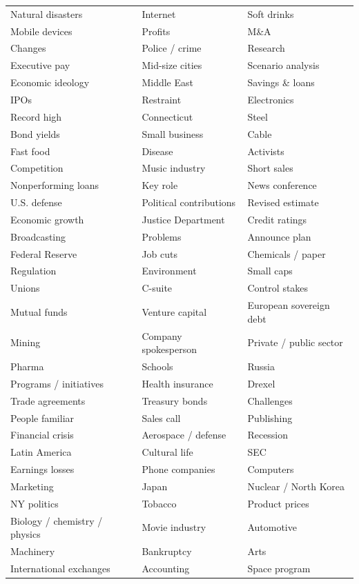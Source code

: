 \begin{longtable}{>{\raggedright\arraybackslash}p{}
                  >{\raggedright\arraybackslash}p{}
                  >{\raggedright\arraybackslash}p{}}
Natural disasters & Internet & Soft drinks \\
Mobile devices & Profits & M\&A \\
Changes & Police / crime & Research \\
Executive pay & Mid-size cities & Scenario analysis \\
Economic ideology & Middle East & Savings \& loans \\
IPOs & Restraint & Electronics \\
Record high & Connecticut & Steel \\
Bond yields & Small business & Cable \\
Fast food & Disease & Activists \\
Competition & Music industry & Short sales \\
Nonperforming loans & Key role & News conference \\
U.S. defense & Political contributions & Revised estimate \\
Economic growth & Justice Department & Credit ratings \\
Broadcasting & Problems & Announce plan \\
Federal Reserve & Job cuts & Chemicals / paper \\
Regulation & Environment & Small caps \\
Unions & C-suite & Control stakes \\
Mutual funds & Venture capital & European sovereign debt \\
Mining & Company spokesperson & Private / public sector \\
Pharma & Schools & Russia \\
Programs / initiatives & Health insurance & Drexel \\
Trade agreements & Treasury bonds & Challenges \\
People familiar & Sales call & Publishing \\
Financial crisis & Aerospace / defense & Recession \\
Latin America & Cultural life & SEC \\
Earnings losses & Phone companies & Computers \\
Marketing & Japan & Nuclear / North Korea \\
NY politics & Tobacco & Product prices \\
Biology / chemistry / physics & Movie industry & Automotive \\
Machinery & Bankruptcy & Arts \\
International exchanges & Accounting & Space program \\

\end{longtable}

